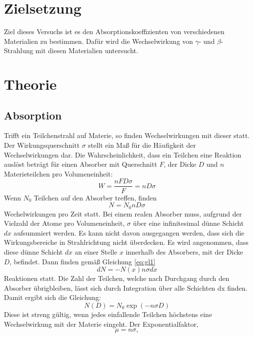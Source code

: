 \section{Zielsetzung}
Ziel dieses Versuchs ist es den Absorptionskoeffizienten von verschiedenen Materialien zu bestimmen.
Dafür wird die Wechselwirkung von $\gamma$- und $\beta$-Strahlung mit diesen Materialien untersucht.
\section{Theorie}
\label{sec:Theorie}
\subsection{Absorption}
Trifft ein Teilchenstrahl auf Materie, so finden Wechselwirkungen mit dieser statt.
Der Wirkungsquerschnitt $\sigma$ stellt ein Maß für die Häufigkeit der Wechselwirkungen dar.
Die Wahrscheinlichkeit, dass ein Teilchen eine Reaktion auslöst beträgt für einen Absorber mit Querschnitt $F$,
der Dicke $D$ und $n$ Materieteilchen pro Volumeneinheit:
\begin{equation}
  W= \frac{nFD\sigma}{F}= nD \sigma
\end{equation}
Wenn $N_0$ Teilchen auf den Absorber treffen, finden
\begin{equation}
  N = N_0 nD \sigma
  \label{eq:gl1}
\end{equation}
Wechelwirkungen pro Zeit statt.
Bei einem realen Absorber muss, aufgrund der Vielzahl der Atome pro Volumeneinheit, $\sigma$ über eine infinitesimal dünne Schicht $dx$ aufsummiert werden.
Es kann nicht davon ausgegangen werden, dass sich die Wirkungsbereiche in Strahlrichtung nicht überdecken.
Es wird angenommen, dass diese dünne Schicht $dx$ an einer Stelle $x$ innerhalb des Absorbers, mit der Dicke $D$, befindet.
Dann finden gemäß Gleichung \eqref{eq:gl1}
\begin{equation}
  dN = -N(x) n \sigma dx
\end{equation}
Reaktionen statt.
Die Zahl der Teilchen, welche nach Durchgang durch den Absorber übrigbleiben, lässt sich durch Integration über alle Schichten dx finden.
Damit ergibt sich die Gleichung:
\begin{equation}
  N(D) = N_0 \exp(-n\sigma D)
\end{equation}
Diese ist streng gültig, wenn jedes einfallende Teilchen höchstens eine Wechselwirkung mit der Materie eingeht.
Der Exponentialfaktor,
\begin{equation}
  \mu = n \sigma,
\end{equation}
